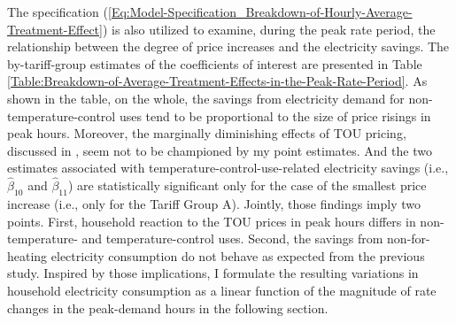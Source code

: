 The specification (\ref{Eq:Model-Specification_Breakdown-of-Hourly-Average-Treatment-Effect}) is also utilized to examine, during the peak rate period, the relationship between the degree of price increases and the electricity savings. The by-tariff-group estimates of the coefficients of interest are presented in Table \ref{Table:Breakdown-of-Average-Treatment-Effects-in-the-Peak-Rate-Period}. As shown in the table, on the whole, the savings from electricity demand for non-temperature-control uses tend to be proportional to the size of price risings in peak hours. Moreover, the marginally diminishing effects of TOU pricing, discussed in \cite{Peaking-Interest:How-Awareness-Drives-the-Effectiveness-of-Time-of-Use-Electricity-Pricing_Prest_2020}, seem not to be championed by my point estimates. And the two estimates associated with temperature-control-use-related electricity savings (i.e., $\hat{\beta}_{10}$ and $\hat{\beta}_{11}$) are statistically significant only for the case of the smallest price increase (i.e., only for the Tariff Group A). Jointly, those findings imply two points. First, household reaction to the TOU prices in peak hours differs in non-temperature- and temperature-control uses. Second, the savings from non-for-heating electricity consumption do not behave as expected from the previous study. Inspired by those implications, I formulate the resulting variations in household electricity consumption as a linear function of the magnitude of rate changes in the peak-demand hours in the following section.

%

